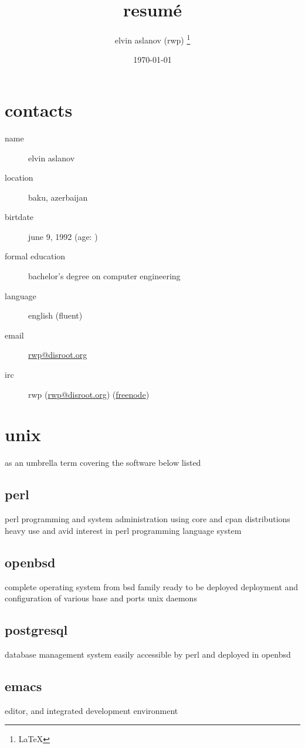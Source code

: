 \documentclass{article}
\title{resumé}
\author{elvin aslanov (rwp) \thanks{\LaTeX}}
\date{\today}
\begin{document}
\begin{titlepage}
\maketitle
\end{titlepage}
\section{contacts}
\begin{description}
\item[name] elvin aslanov
\item[location] baku, azerbaijan
\item[birtdate] june 9, 1992 (age: \pgfmathresult)
\item[formal education] bachelor's degree on computer engineering
\item[language] english (fluent)
\item[email] \href{mailto:rwp@disroot.org}{rwp@disroot.org}
\item[irc] rwp (\url{rwp@disroot.org}) (\href{https://freenode.net/}{freenode})
\end{description}
\section{unix}
as an umbrella term covering the software below listed
\subsection{perl}
perl programming and system administration using core and cpan distributions
heavy use and avid interest in perl programming language system
\subsection{openbsd}
complete operating system from bsd family ready to be deployed
deployment and configuration of various base and ports unix daemons
\subsection{postgresql}
database management system easily accessible by perl and deployed in openbsd
\subsection{emacs}
editor, and integrated development environment
\end{document}
